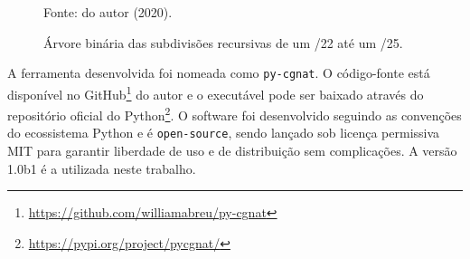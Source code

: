     \begin{figure}[!htb]
        \centering
        \caption{Árvore binária das subdivisões recursivas de um /22 até um /25.}
        \label{fig:arvore_binaria}
        
        \small

        {\small Fonte: do autor (2020).} 
    \end{figure}
    
    A ferramenta desenvolvida foi nomeada como {\tt py-cgnat}. O código-fonte está disponível no GitHub\footnote{\url{https://github.com/williamabreu/py-cgnat}} do autor e o executável pode ser baixado através do repositório oficial do Python\footnote{\url{https://pypi.org/project/pycgnat/}}. O software foi desenvolvido seguindo as convenções do ecossistema Python e é {\tt open-source}, sendo lançado sob licença permissiva MIT para garantir liberdade de uso e de distribuição sem complicações. A versão 1.0b1 é a utilizada neste trabalho.
    
